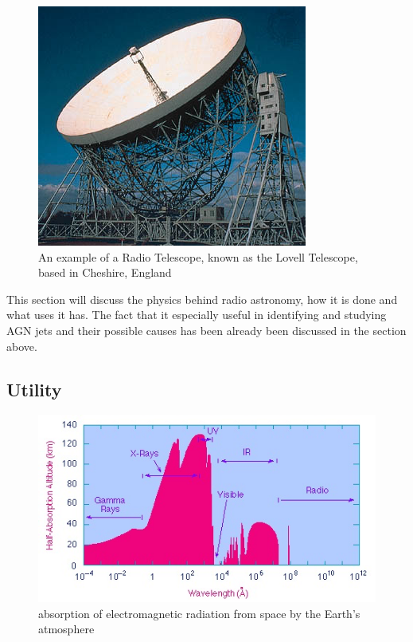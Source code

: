\documentclass{article}
\begin{document}
\begin{figure}
    \centering
    \includegraphics{Lovell Telescope.jpg}
    \caption{An example of a Radio Telescope, known as the Lovell Telescope, based in Cheshire, England}
    \label{fig:Lovell}
\end{figure}

This section will discuss the physics behind radio astronomy, how it is done and what uses it has. The fact that it especially useful in identifying and studying AGN jets and their possible causes has been already been discussed in the section above.

\subsection{Utility}

\begin{figure}
\centering
\includegraphics{atmos_windows.jpg}
\caption{absorption of electromagnetic radiation from space by the Earth's atmosphere}
\label{fig:atmosphere}
\end{figure}
\end{document}
